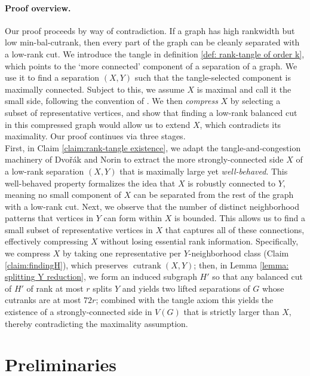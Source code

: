 \documentclass{article}
\theoremstyle{definition}
\begin{document}
\paragraph{Proof overview.} Our proof proceeds by way of contradiction. If a graph has high rankwidth but low min-bal-cutrank, then every part of the graph can be cleanly separated with a low-rank cut. We introduce the tangle in definition \ref{def: rank-tangle of order k}, which points to the `more connected' component of a separation of a graph. We use it to find a separation $(X,Y)$ such that the tangle-selected component is maximally connected. Subject to this, we assume $X$ is maximal and call it the {small side}, following the convention of \cite{Dvorak_Norin_2018}. We then \emph{compress} $X$ by selecting a subset of {representative} vertices, and show that finding a low-rank balanced cut in this compressed graph would allow us to extend $X$, which contradicts its maximality. Our proof continues via three stages.\\

First, in Claim \ref{claim:rank-tangle existence}, we adapt the tangle-and-congestion machinery of Dvořák and Norin \cite{Dvorak_Norin_2018} to extract the more strongly-connected side $X$ of a low-rank separation $(X,Y)$ that is maximally large yet \emph{well-behaved}. This well-behaved property formalizes the idea that $X$ is robustly connected to $Y$, meaning no small component of $X$ can be separated from the rest of the graph with a low-rank cut. Next, we observe that the number of distinct neighborhood patterns that vertices in $Y$ can form within $X$ is bounded. This allows us to find a small subset of representative vertices in $X$ that captures all of these connections, effectively compressing $X$ without losing essential rank information. Specifically, we compress $X$ by taking one representative per $Y$-neighborhood class (Claim \ref{claim:findingH}), which preserves $\operatorname{cutrank}(X,Y)$; then, in Lemma \ref{lemma: splitting Y reduction}, we form an induced subgraph $H'$  so that any balanced cut of $H'$ of rank at most $r$ splits $Y$ and yields two lifted separations of $G$ whose cutranks are at most $72r$; combined with the tangle axiom this yields the existence of a strongly-connected side in $V(G)$ that is strictly larger than $X$, thereby contradicting the maximality assumption.\\

\section{Preliminaries}\label{sec:prelim}
\end{document}
